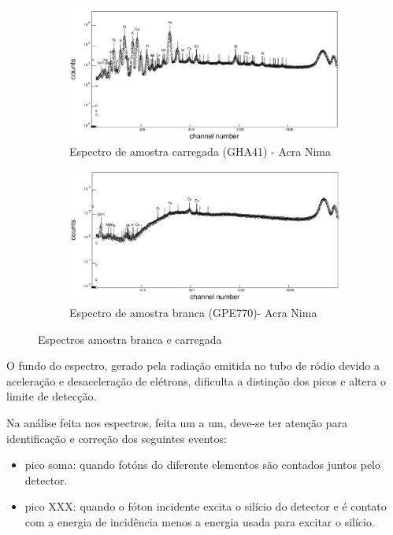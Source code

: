 \begin{figure}[H]
  \centering
  \begin{subfigure}[b]{0.7\textwidth}
    \includegraphics[width=\textwidth]{../inputs/images/winqxas/GHA41editado.pdf}
    \caption{Espectro de amostra carregada (GHA41) - Acra Nima}
  \end{subfigure}
  \begin{subfigure}[b]{0.7\textwidth}
    \includegraphics[width=\textwidth]{../inputs/images/winqxas/GPE770editado.pdf}
     \caption{Espectro de amostra branca (GPE770)- Acra Nima}
  \end{subfigure}
  \caption{Espectros amostra branca e carregada \label{fig:winqxas}}
\end{figure}

O fundo do espectro, gerado pela radiação emitida no tubo de ródio
devido a aceleração e desaceleração de elétrons, dificulta a distinção 
dos picos e altera o limite de detecção. 

Na análise feita nos espectros, feita um a um, deve-se ter atenção 
para identificação e correção dos seguintes eventos: 

\begin{itemize}
  \item pico soma: quando fotóns do diferente elementos são contados
        juntos pelo detector. 
  \item pico XXX: quando o fóton incidente excita o silício do detector
        e é contato com a energia de incidência menos a energia usada para excitar o silício. 
\end{itemize}


